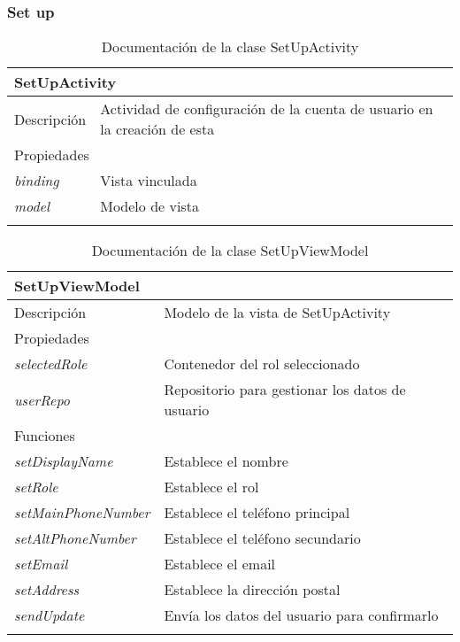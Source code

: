 \subsubsection{Set up}

\begin{longtable}{|p{} p{}|}
    \hline
    \multicolumn{2}{|l|}{\textbf{SetUpActivity}} \\ \hline \hline
    Descripción      & Actividad de configuración de la cuenta de usuario en la creación de esta \\ \hline
    \multicolumn{2}{|l|}{Propiedades} \\
    \emph{binding}  & Vista vinculada  \\
    \emph{model}  & Modelo de vista  \\ \hline
    \caption{Documentación de la clase SetUpActivity}
    \label{dis:app:setup_activity}
\end{longtable}

\begin{longtable}{|p{} p{}|}
    \hline
    \multicolumn{2}{|l|}{\textbf{SetUpViewModel}} \\ \hline \hline
    Descripción      & Modelo de la vista de SetUpActivity \\ \hline
    \multicolumn{2}{|l|}{Propiedades} \\
    \emph{selectedRole}  & Contenedor del rol seleccionado  \\
    \emph{userRepo}  & Repositorio para gestionar los datos de usuario  \\ \hline
    \multicolumn{2}{|l|}{Funciones} \\
    \emph{setDisplayName}  & Establece el nombre  \\
    \emph{setRole}  & Establece el rol  \\
    \emph{setMainPhoneNumber}  & Establece el teléfono principal  \\
    \emph{setAltPhoneNumber}  & Establece el teléfono secundario  \\
    \emph{setEmail}  & Establece el email  \\
    \emph{setAddress}  & Establece la dirección postal  \\
    \emph{sendUpdate}  & Envía los datos del usuario para confirmarlo  \\ \hline
    \caption{Documentación de la clase SetUpViewModel}
    \label{dis:app:setup_viewmodel}
\end{longtable}

